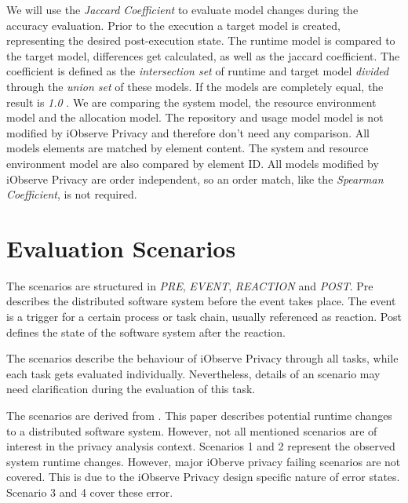 We will use the \textit{Jaccard Coefficient} to evaluate model changes during the accuracy evaluation. Prior to the execution a target model is created, representing the desired post-execution state. The runtime model is compared to the target model, differences get calculated, as well as the jaccard coefficient. The coefficient is defined as the \textit{intersection set} of runtime and target model \textit{divided} through the \textit{union set} of these models. If the models are completely equal, the result is \textit{1.0} \cite{Andale.20161202}. We are comparing the system model, the resource environment model and the allocation model. The repository and usage model model is not modified by iObserve Privacy and therefore don't need any comparison. All models elements are matched by element content. The system and resource environment model are also compared by element ID. All models modified by iObserve Privacy are order independent, so an order match, like the \textit{Spearman Coefficient}, is not required.


\section{Evaluation Scenarios}
\label{sec:Evaluation:scenarios}

The scenarios are structured in \textit{PRE}, \textit{EVENT}, \textit{REACTION} and \textit{POST}. Pre describes the distributed software system before the event takes place. The event is a trigger for a certain process or task chain, usually referenced as reaction. Post defines the state of the software system after the reaction.

The scenarios describe the behaviour of iObserve Privacy through all tasks, while each task gets evaluated individually. Nevertheless, details of an scenario may need clarification during the evaluation of this task.

The scenarios are derived from \cite{Heinrich.2016b}. This paper describes potential runtime changes to a distributed software system. However, not all mentioned scenarios are of interest in the privacy analysis context. Scenarios 1 and 2 represent the observed system runtime changes. However, major iOberve privacy failing scenarios are not covered. This is due to the iObserve Privacy design specific nature of error states. Scenario 3 and 4 cover these error.

